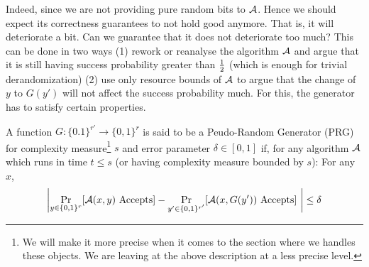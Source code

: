 Indeed, since we are not providing pure random bits to ${\cal{A}}$. Hence we should expect its correctness guarantees to not hold good anymore. That is, it will deteriorate a bit. Can we guarantee that it does not deteriorate too much? This can be done in two ways (1) rework or reanalyse the algorithm ${\cal{A}}$ and argue that it is still having success probability greater than $\frac{1}{2}$ (which is enough for trivial derandomization) (2) use only resource bounds of ${\cal{A}}$ to argue that the change of $y$ to $G(y')$ will not affect the success probability much. For this, the generator has to satisfy certain properties.

A function $G : \{0.1\}^{r'} \to \{0,1\}^r$ is said to be a Peudo-Random Generator (PRG) for complexity measure\footnote{We will make it more precise when it comes to the section where we handles these objects. We are leaving at the above description at a less precise level.} $s$ and error parameter $\delta \in [0,1]$ if, for any algorithm ${\cal{A}}$ which runs in time $t \le s$ (or having complexity measure bounded by $s$): For any $x$,
$$\left|\Pr_{y \in \{0,1\}^r} [{\cal{A}}(x,y) \textrm{ Accepts}] - \Pr_{y' \in \{0,1\}^{r'}} [{\cal{A}}(x,G(y')) \textrm{ Accepts}]~\right| \le \delta$$

